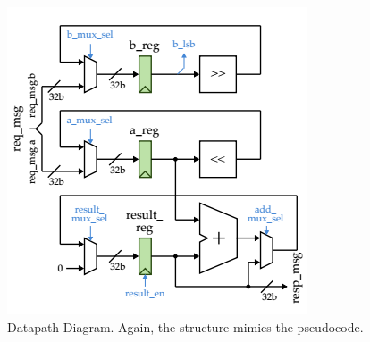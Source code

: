 \documentclass[11pt]{article}
\begin{document}
\begin{figure}
\centering
\includegraphics[scale=0.6]{Datapath}
\caption{Datapath Diagram. Again, the structure mimics the pseudocode.}
\end{figure}
\end{document}
